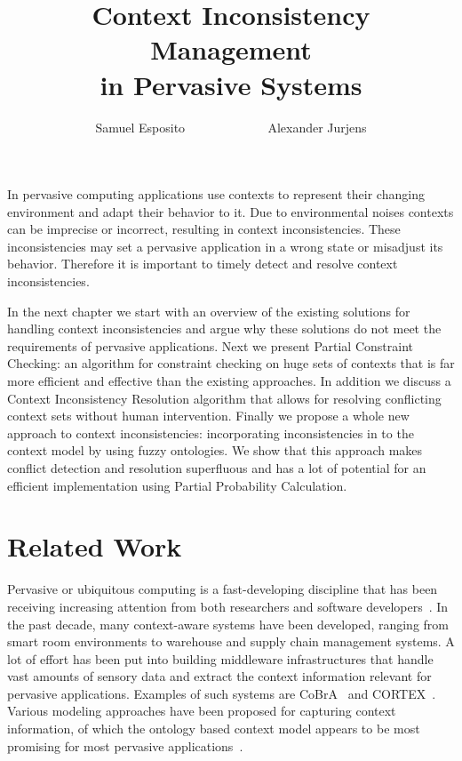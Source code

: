 \documentclass[journal]{vgtc}                %
\title{Context Inconsistency Management \\in Pervasive Systems}
\author{Samuel Esposito ~~~~~~~~~~~~ Alexander Jurjens}
\begin{document}


\maketitle
In pervasive computing applications use contexts to represent their changing environment and adapt their behavior to it. Due to environmental noises contexts can be imprecise or incorrect, resulting in context inconsistencies. These inconsistencies may set a pervasive application in a wrong state or misadjust its behavior. Therefore it is important to timely detect and resolve context inconsistencies. 

In the next chapter we start with an overview of the existing solutions for handling context inconsistencies and argue why these solutions do not meet the requirements of pervasive applications. Next we present Partial Constraint Checking: an algorithm for constraint checking on huge sets of contexts that is far more efficient and effective than the existing approaches. In addition we discuss a Context Inconsistency Resolution algorithm that allows for resolving conflicting context sets without human intervention. Finally we propose a whole new approach to context inconsistencies: incorporating inconsistencies in to the context model by using fuzzy ontologies. We show that this approach makes conflict detection and resolution superfluous and has a lot of potential for an efficient implementation using Partial Probability Calculation.

\section{Related Work}
Pervasive or ubiquitous computing is a fast-developing discipline that has been receiving increasing attention from both researchers and software developers~\cite{xu:2010:PCC}. In the past decade, many context-aware systems have been developed, ranging from smart room environments to warehouse and supply chain management systems. A lot of effort has been put into building middleware infrastructures that handle vast amounts of sensory data and extract the context information relevant for pervasive applications. Examples of such systems are CoBrA~\cite{1276865} and CORTEX~\cite{1276875}. Various modeling approaches have been proposed for capturing context information, of which the ontology based context model appears to be most promising for most pervasive applications~\cite{bu:2006:CCM}.
\end{document}
